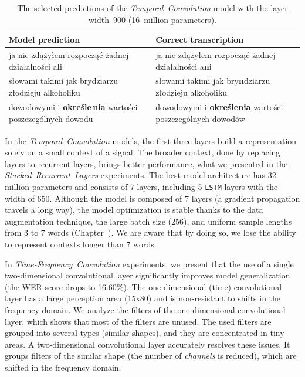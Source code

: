 \begin{table}[h!]
\vspace*{10pt}
\small
\centering
 \begin{tabular}{p{5cm} | p{5cm}}
  \toprule
  Model prediction & Correct transcription \\
  \midrule
  ja nie zdążyłem rozpocząć żadnej działalności a\textbf{l}i & ja nie zdążyłem rozpocząć żadnej działalności a\textbf{n}i               \\[5pt]
  słowami takimi jak brydziarzu złodzieju alkoholiku & słowami takimi jak bry\textbf{n}dziarzu złodzieju alkoholiku                     \\[5pt]
  dowodowymi i \textbf{określe\,nia} wartości poszczególnych dowodu & dowodowymi i \textbf{określenia} wartości poszczególnych dowodów  \\
  \bottomrule
 \end{tabular}
\caption{The selected predictions of the \textit{Temporal~Convolution} model with the layer width~900 (16~million parameters).}
\label{table:samples-baseline}
\end{table}

In the \textit{Temporal~Convolution} models, the first three layers build a representation solely on a small context of a signal.
The broader context, done by replacing  layers to recurrent layers, brings better performance, what
we presented in the \textit{Stacked~Recurrent~Layers} experiments.
The best model architecture has 32 million parameters and consists of 7 layers,
including 5 \texttt{LSTM} layers with the width of 650.
Although the model is composed of 7 layers (a gradient propagation travels a long way),
the model optimization is stable thanks to the data augmentation technique,
the large batch size (256), and uniform sample lengths from 3 to 7 words (Chapter~).
We are aware that by doing so, we lose the ability to represent contexts longer than 7 words.

In \textit{Time-Frequency~Convolution} experiments, we present that the use of a single
two-dimensional convolutional layer significantly improves model generalization (the WER score drops to 16.60\%).
The one-dimensional (time) convolutional layer has a large perception area (15x80)
and is non-resistant to shifts in the frequency domain.
We analyze the filters of the one-dimensional convolutional layer,
which shows that most of the filters are unused.
The used filters are grouped into several types (similar shapes), and they are concentrated in tiny areas.
A two-dimensional convolutional layer accurately resolves these issues.
It groups filters of the similar shape (the number of \textit{channels} is reduced), which are shifted in the frequency domain.



